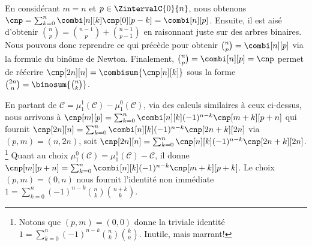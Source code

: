 En considérant $m = n$ et $p \in \ZintervalC{0}{n}$,
nous obtenons
$\cnp = \sum_{k=0}^n \combi[n][k] \cnp[0][p-k] = \combi[n][p]$.
%
Ensuite,
il est aisé d'obtenir
$\binom{n}{p} = \binom{n-1}{p} + \binom{n-1}{p-1}$
en raisonnant juste sur des arbres binaires.
%
Nous pouvons donc reprendre ce qui précède pour obtenir $\binom{n}{p} = \combi[n][p]$ via la formule du binôme de Newton.
%
Finalement,
$\binom{n}{p} = \combi[n][p] = \cnp$
permet de réécrire
$\cnp[2n][n] = \combisum{\cnp[n][k]}$
sous la forme
$\binom{2n}{n} = \binosum{\binom{n}{k}}$.




\begin{remark}
	En partant de
	$\mathcal{C} = \mu_1^1(\mathcal{C}) - \mu_1^0(\mathcal{C})$,
	via des calculs similaires à ceux ci-dessus,
	nous arrivons à
    $\cnp[m][p] = \sum_{k=0}^n \combi[n][k] (-1)^{n-k} \cnp[m+k][p+n]$
    qui fournit 
    $\cnp[2n][n] = \sum_{k=0}^n \combi[n][k] (-1)^{n-k} \cnp[2n+k][2n]$
    via $(p,m) = (n,2n)$,
    soit
    $\cnp[2n][n] = \sum_{k=0}^n \cnp[n][k] (-1)^{n-k} \cnp[2n+k][2n]$.%
    \footnote{
		Notons que $(p,m) = (0,0)$ donne la triviale identité
		$1 = \sum_{k=0}^n (-1)^{n-k} \binom{n}{k} \binom{k}{n}$.
		Inutile, mais marrant!
	}
    Quant au choix
	$\mu_1^0(\mathcal{C}) = \mu_1^1(\mathcal{C}) - \mathcal{C}$,
	il donne
    $\cnp[m][p+n] = \sum_{k=0}^n \combi[n][k] (-1)^{n-k} \cnp[m+k][p+k]$.
    Le choix $(p,m) = (0,n)$ nous fournit l'identité non immédiate
    $1 = \sum_{k=0}^n (-1)^{n-k} \binom{n}{k} \binom{n+k}{k}$.
\end{remark}
